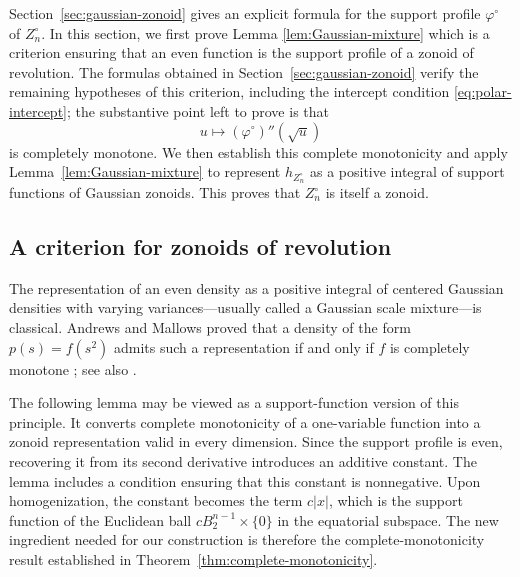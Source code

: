\documentclass[11pt]{article}
\theoremstyle{definition}
\theoremstyle{remark}
\newcommand{\abs}[1]{\left|#1\right|}
\begin{document}
Section~\ref{sec:gaussian-zonoid} gives an explicit formula
for the support profile $\varphi^\circ$ of $Z_n^\circ$.  In this section, we first
prove Lemma \ref{lem:Gaussian-mixture} which is a criterion ensuring that an even function is the support
profile of a zonoid of revolution.  The formulas obtained in
Section~\ref{sec:gaussian-zonoid} verify the remaining hypotheses of
this criterion, including the intercept condition
\eqref{eq:polar-intercept}; the substantive point left to prove is
that
\[
 u\longmapsto(\varphi^\circ)''(\sqrt u)
\]
is completely monotone.  We then establish this complete monotonicity and apply
Lemma~\ref{lem:Gaussian-mixture} to represent $h_{Z_n^\circ}$ as a
positive integral of support functions of Gaussian zonoids.  This
proves that $Z_n^\circ$ is itself a zonoid.

\subsection{A criterion for zonoids
of revolution}
\label{subsec:zonoid-criterion}

The representation of an even density as a positive integral of
centered Gaussian densities with varying variances---usually called a
Gaussian scale mixture---is classical.  Andrews and Mallows proved
that a density of the form $p(s)=f(s^2)$ admits such a representation
if and only if $f$ is completely monotone
\cite{AndrewsMallows1974}; see also \cite{West1987}.

The following lemma may be viewed as a support-function version of
this principle.  It converts complete monotonicity of a one-variable
function into a zonoid representation valid in every dimension.
Since the support profile is even, recovering it from its second
derivative introduces an additive constant.  The lemma includes a condition ensuring that this constant is
nonnegative.  Upon homogenization, the constant becomes the term
$c\abs{x}$, which is the support function of the Euclidean ball
$cB_2^{n-1}\times\{0\}$ in the equatorial subspace.  The new
ingredient needed for our construction is therefore the
complete-monotonicity result established in
Theorem~\ref{thm:complete-monotonicity}.
\end{document}
